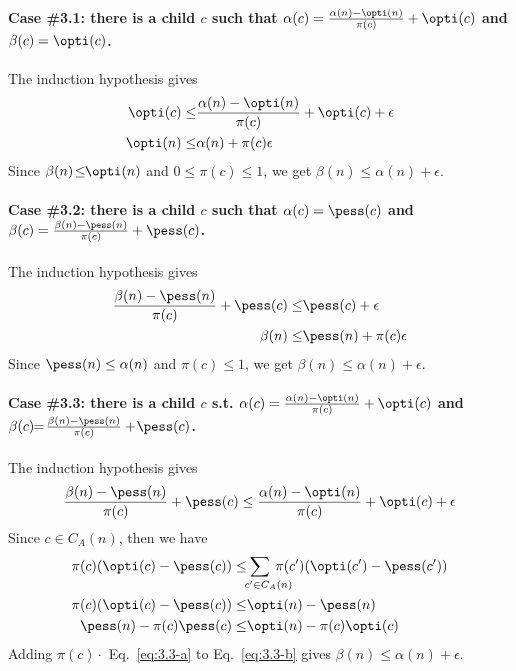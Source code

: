 
\paragraph{Case \#3.1: there is a child $c$ such that $\alpha(c)=\frac{\alpha(n)-\opti(n)}{\pi(c)}+\opti(c)$ and $\beta(c)=\opti(c)$.} 
The induction hypothesis gives
\begin{align}
\opti(c) \leq & \frac{\alpha(n)-\opti(n)}{\pi(c)}+\opti(c)+\epsilon \\
\opti(n) \leq & \alpha(n) + \pi(c)\epsilon
\end{align}
Since $\beta(n)\!\leq\!\!\opti(n)$ and $0\!\leq\!\pi(c)\!\leq\!1$, we get $\beta(n)\!\leq\!\alpha(n) + \epsilon$.

\paragraph{Case \#3.2: there is a child $c$ such that $\alpha(c)=\pess(c)$ 
	and $\beta(c)=\frac{\beta(n)-\pess(n)}{\pi(c)}+\pess(c)$.} 
The induction hypothesis gives
\begin{align}
\frac{\beta(n)-\pess(n)}{\pi(c)}+\pess(c) \leq & \pess(c)+\epsilon \\
\beta(n) \leq & \pess(n) + \pi(c) \epsilon
\end{align}
Since $\pess(n) \leq \alpha(n)$ and $\pi(c) \leq 1$, we get $\beta(n) \leq \alpha(n) + \epsilon$.

\paragraph{Case \#3.3: there is a child $c$ s.t. $\alpha(c)=\frac{\alpha(n)-\opti(n)}{\pi(c)}+\opti(c)$ and $\beta(c)\!\!=\!\frac{\beta(n)-\pess(n)}{\pi(c)} +\!\pess(c)$.\!\!\!\!}
The induction hypothesis gives
\begin{align}
\frac{\beta(n)-\pess(n)}{\pi(c)}+\pess(c) \leq \frac{\alpha(n)-\opti(n)}{\pi(c)}+\opti(c) + \epsilon\label{eq:3.3-a}
\end{align}
Since $c\in C_A(n)$, then we have
\begin{align}
\pi(c)(\opti(c)-\pess(c)) \leq & \!\!\sum_{c'\in C_A(n)\!\!\!\!\!\!\!\!\!} \!\pi(c')(\opti(c')-\pess(c'))\\
\pi(c)(\opti(c)-\pess(c)) \leq & \opti(n)-\pess(n)\\
\pess(n) - \pi(c)\pess(c) \leq & \opti(n)-\pi(c)\opti(c) \label{eq:3.3-b}
\end{align}
Adding $\pi(c) \cdot$ Eq.~\eqref{eq:3.3-a} to Eq.~\eqref{eq:3.3-b} gives $\beta(n) \leq \alpha(n)+\epsilon$.


